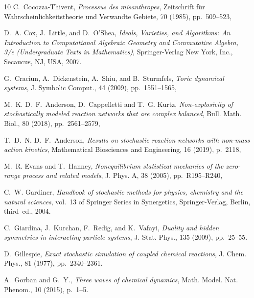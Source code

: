 \documentclass{amsart}
\theoremstyle{definition}
\theoremstyle{remark}
\theoremstyle{Conjecture/open problem}
\theoremstyle{assumption}
\theoremstyle{conjecture}
\numberwithin{equation}{section}
\begin{document}
\begin{thebibliography}{10}
{\sc C.~Cocozza-Thivent}, {\em Processus des misanthropes}, Zeitschrift f{\"u}r
  Wahrscheinlichkeitstheorie und Verwandte Gebiete, 70 (1985), pp.~509--523,

{\sc D.~A. Cox, J.~Little, and D.~O'Shea}, {\em Ideals, Varieties, and
  Algorithms: An Introduction to Computational Algebraic Geometry and
  Commutative Algebra, 3/e (Undergraduate Texts in Mathematics)},
  Springer-Verlag New York, Inc., Secaucus, NJ, USA, 2007.

{\sc G.~Craciun, A.~Dickenstein, A.~Shiu, and B.~Sturmfels}, {\em Toric
  dynamical systems}, J. Symbolic Comput., 44 (2009), pp.~1551--1565,

{\sc M.~K. D.~F.~Anderson, D.~Cappelletti and T.~G. Kurtz}, {\em
  Non-explosivity of stochastically modeled reaction networks that are complex
  balanced}, Bull. Math. Biol., 80 (2018), pp.~2561--2579,

{\sc T.~D.~N. D.~F.~Anderson}, {\em Results on stochastic reaction networks
  with non-mass action kinetics}, Mathematical Biosciences and Engineering, 16
  (2019), p.~2118, %

{\sc M.~R. Evans and T.~Hanney}, {\em Nonequilibrium statistical mechanics of
  the zero-range process and related models}, J. Phys. A, 38 (2005),
  pp.~R195--R240, %

{\sc C.~W. Gardiner}, {\em Handbook of stochastic methods for physics,
  chemistry and the natural sciences}, vol.~13 of Springer Series in
  Synergetics, Springer-Verlag, Berlin, third~ed., 2004.

{\sc C.~Giardina, J.~Kurchan, F.~Redig, and K.~Vafayi}, {\em {Duality and
  hidden symmetries in interacting particle systems}}, J. Stat. Phys., 135
  (2009), pp.~25--55.

{\sc D.~Gillespie}, {\em {Exact stochastic simulation of coupled chemical
  reactions}}, J. Chem. Phys., 81 (1977), pp.~2340--2361.

{\sc A.~Gorban and G.~Y.}, {\em Three waves of chemical dynamics}, Math. Model.
  Nat. Phenom., 10 (2015), p.~1–5.


\end{thebibliography}
\end{document}
